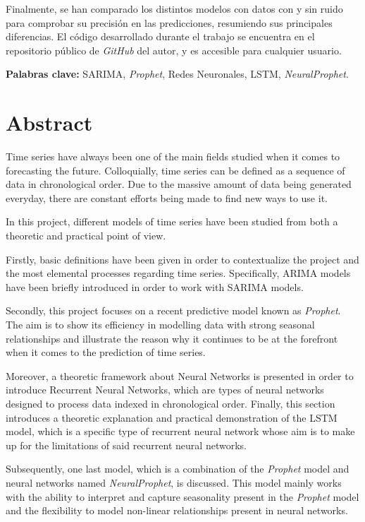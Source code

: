 \documentclass[12pt,twoside]{article}
\begin{document}
Finalmente, se han comparado los distintos modelos con datos con y sin ruido para comprobar su precisión en las predicciones, resumiendo sus principales diferencias. El código desarrollado durante el trabajo se encuentra en el repositorio público de \textit{GitHub} del autor, y es accesible para cualquier usuario.

\textbf{Palabras clave:} SARIMA, \textit{Prophet}, Redes Neuronales, LSTM, \textit{NeuralProphet}.

\newpage

\section*{Abstract}

Time series have always been one of the main fields studied when it comes to forecasting the future. Colloquially, time series can be defined as a sequence of data in chronological order. Due to the massive amount of data being generated everyday, there are constant efforts being made to find new ways to use it.

In this project, different models of time series have been studied from both a theoretic and practical point of view. 

Firstly, basic definitions have been given in order to contextualize the project and the most elemental processes regarding time series. Specifically, ARIMA models have been briefly introduced in order to work with SARIMA models. 

Secondly, this project focuses on a recent predictive model known as \textit{Prophet}. The aim is to show its efficiency in modelling data with strong seasonal relationships and illustrate the reason why it continues to be at the forefront when it comes to the prediction of time series. 

Moreover, a theoretic framework about Neural Networks is presented in order to introduce Recurrent Neural Networks, which are types of neural networks designed to process data indexed in chronological order. Finally, this section introduces a theoretic explanation and practical demonstration of the LSTM model, which is a specific type of recurrent neural network whose aim is to make up for the limitations of said recurrent neural networks. 

Subsequently, one last model, which is a combination of the \textit{Prophet} model and neural networks named \textit{NeuralProphet}, is discussed. This model mainly works with the ability to interpret and capture seasonality present in the \textit{Prophet} model and the flexibility to model non-linear relationships present in neural networks. 
\end{document}
